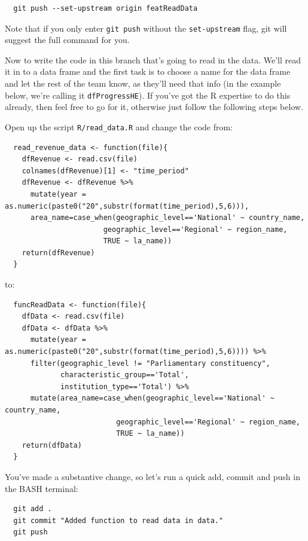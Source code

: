\documentclass[
  12pt,
]{article}
\begin{document}
\begin{verbatim}
  git push --set-upstream origin featReadData
\end{verbatim}

Note that if you only enter \texttt{git\ push} without the
\texttt{set-upstream} flag, git will suggest the full command for you.

Now to write the code in this branch that's going to read in the data.
We'll read it in to a data frame and the first task is to choose a name
for the data frame and let the rest of the team know, as they'll need
that info (in the example below, we're calling it
\texttt{dfProgressHE}). If you've got the R expertise to do this
already, then feel free to go for it, otherwise just follow the
following steps below.

Open up the script \texttt{R/read\_data.R} and change the code from:

\begin{verbatim}
  read_revenue_data <- function(file){
    dfRevenue <- read.csv(file)
    colnames(dfRevenue)[1] <- "time_period"
    dfRevenue <- dfRevenue %>% 
      mutate(year = as.numeric(paste0("20",substr(format(time_period),5,6))),
      area_name=case_when(geographic_level=='National' ~ country_name,
                       geographic_level=='Regional' ~ region_name,
                       TRUE ~ la_name))
    return(dfRevenue)
  }
\end{verbatim}

to:

\begin{verbatim}
  funcReadData <- function(file){
    dfData <- read.csv(file)
    dfData <- dfData %>% 
      mutate(year = as.numeric(paste0("20",substr(format(time_period),5,6)))) %>%
      filter(geographic_level != "Parliamentary constituency",
             characteristic_group=='Total',
             institution_type=='Total') %>%
      mutate(area_name=case_when(geographic_level=='National' ~ country_name,
                          geographic_level=='Regional' ~ region_name,
                          TRUE ~ la_name))
    return(dfData)
  }
\end{verbatim}

You've made a substantive change, so let's run a quick add, commit and
push in the BASH terminal:

\begin{verbatim}
  git add .
  git commit "Added function to read data in data."
  git push
\end{verbatim}
\end{document}

